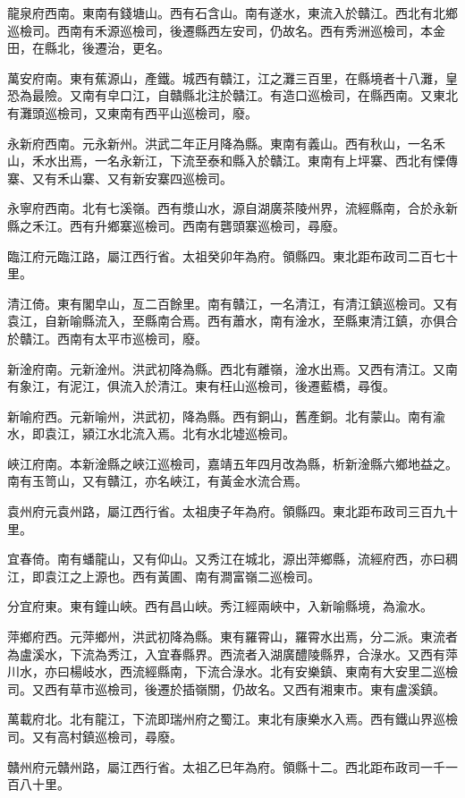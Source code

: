 龍泉府西南。東南有錢塘山。西有石含山。南有遂水，東流入於贛江。西北有北鄉巡檢司。西南有禾源巡檢司，後遷縣西左安司，仍故名。西有秀洲巡檢司，本金田，在縣北，後遷治，更名。

萬安府南。東有蕉源山，產鐵。城西有贛江，江之灘三百里，在縣境者十八灘，皇恐為最險。又南有皁口江，自贛縣北注於贛江。有造口巡檢司，在縣西南。又東北有灘頭巡檢司，又東南有西平山巡檢司，廢。

永新府西南。元永新州。洪武二年正月降為縣。東南有義山。西有秋山，一名禾山，禾水出焉，一名永新江，下流至泰和縣入於贛江。東南有上坪寨、西北有慄傳寨、又有禾山寨、又有新安寨四巡檢司。

永寧府西南。北有七溪嶺。西有漿山水，源自湖廣茶陵州界，流經縣南，合於永新縣之禾江。西有升鄉寨巡檢司。西南有礱頭寨巡檢司，尋廢。

臨江府元臨江路，屬江西行省。太祖癸卯年為府。領縣四。東北距布政司二百七十里。

清江倚。東有閣皁山，亙二百餘里。南有贛江，一名清江，有清江鎮巡檢司。又有袁江，自新喻縣流入，至縣南合焉。西有蕭水，南有淦水，至縣東清江鎮，亦俱合於贛江。西南有太平市巡檢司，廢。

新淦府南。元新淦州。洪武初降為縣。西北有離嶺，淦水出焉。又西有清江。又南有象江，有泥江，俱流入於清江。東有枉山巡檢司，後遷藍橋，尋復。

新喻府西。元新喻州，洪武初，降為縣。西有銅山，舊產銅。北有蒙山。南有渝水，即袁江，潁江水北流入焉。北有水北墟巡檢司。

峽江府南。本新淦縣之峽江巡檢司，嘉靖五年四月改為縣，析新淦縣六鄉地益之。南有玉笥山，又有贛江，亦名峽江，有黃金水流合焉。

袁州府元袁州路，屬江西行省。太祖庚子年為府。領縣四。東北距布政司三百九十里。

宜春倚。南有蟠龍山，又有仰山。又秀江在城北，源出萍鄉縣，流經府西，亦曰稠江，即袁江之上源也。西有黃圃、南有澗富嶺二巡檢司。

分宜府東。東有鐘山峽。西有昌山峽。秀江經兩峽中，入新喻縣境，為渝水。

萍鄉府西。元萍鄉州，洪武初降為縣。東有羅霄山，羅霄水出焉，分二派。東流者為盧溪水，下流為秀江，入宜春縣界。西流者入湖廣醴陵縣界，合淥水。又西有萍川水，亦曰楊岐水，西流經縣南，下流合淥水。北有安樂鎮、東南有大安里二巡檢司。又西有草市巡檢司，後遷於插嶺關，仍故名。又西有湘東市。東有盧溪鎮。

萬載府北。北有龍江，下流即瑞州府之蜀江。東北有康樂水入焉。西有鐵山界巡檢司。又有高村鎮巡檢司，尋廢。

贛州府元贛州路，屬江西行省。太祖乙巳年為府。領縣十二。西北距布政司一千一百八十里。


